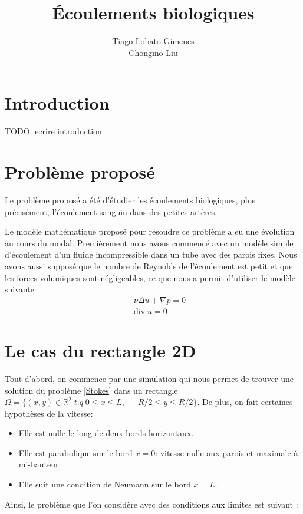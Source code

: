 \documentclass[11pt,a4paper]{article}
\title{Écoulements biologiques}
\author{Tiago Lobato Gimenes \\ Chongmo Liu}
\numberwithin{equation}{subsection}
\numberwithin{figure}{subsection}
\begin{document}
\maketitle

%
%
\section*{Introduction}

TODO: ecrire introduction

%
%
\section{Problème proposé}

Le problème proposé a été d'étudier les écoulements biologiques, plus précisément, l'écoulement sanguin dans des petites artères.
 
Le modèle mathématique proposé pour résoudre ce problème a eu une évolution au cours du modal. Premièrement nous avons commencé avec un modèle simple d'écoulement d'un fluide incompressible dans un tube avec des parois fixes. Nous avons aussi supposé que le nombre de Reynolds de  l'écoulement est petit et que les forces volumiques sont négligeables, ce que nous a permit d'utiliser le modèle suivante:
\begin{equation}
\begin{aligned}
& -\nu \Delta u + \nabla p = 0 \\
& -\mathrm{div}\;u = 0 \label{Stokes}
\end{aligned}
\end{equation}

\section{Le cas du rectangle 2D}
Tout d'abord, on commence par une simulation qui nous permet de trouver une solution du problème \ref{Stokes} dans un rectangle $\Omega = \{(x,y) \in \mathbb{R}^2 \;t.q\; 0 \leq x \leq L, \; -R/2 \leq y \leq R/2\}$. De plus, on fait certaines hypothèses de la vitesse:

\begin{itemize}
\item Elle est nulle le long de deux bords horizontaux.
\item Elle est parabolique sur le bord $x=0$: vitesse nulle aux parois et maximale à mi-hauteur.
\item Elle suit une condition de Neumann sur le bord $x=L$.
\end{itemize}
Ainsi, le problème que l’on considère avec des conditions aux limites est suivant :
\end{document}
